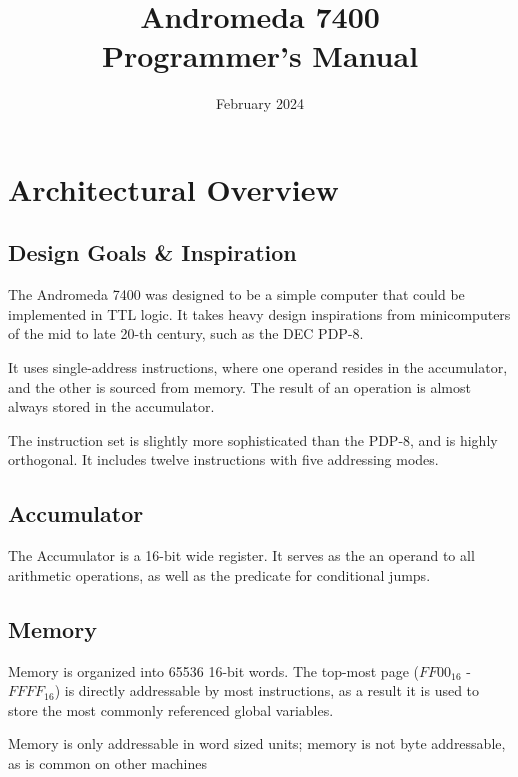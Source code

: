 \documentclass[11pt]{article}
\title{
    Andromeda 7400\\
\large Programmer's Manual}
\date{February 2024}
\begin{document}
    \maketitle

    \pagebreak
    \tableofcontents
    \pagebreak

    \section{Architectural Overview}\label{subsec:archetctural-overview}
    \subsection{Design Goals \& Inspiration}\label{subsec:design-goals-&-inspiration}
    \par The Andromeda 7400 was designed to be a simple computer that could be implemented in TTL logic.
    It takes heavy design inspirations from minicomputers of the mid to late 20-th century, such as the
    DEC PDP-8.
    \par It uses single-address instructions, where one operand resides in the accumulator, and the other is
    sourced from memory.
    The result of an operation is almost always stored in the accumulator.
    \par The instruction set is slightly more sophisticated than the PDP-8, and is highly orthogonal.
    It includes twelve instructions with five addressing modes.

    \subsection{Accumulator}\label{subsec:accumulator}
    \par The Accumulator is a 16-bit wide register.
    It serves as the an operand to all arithmetic operations, as well as the predicate for conditional jumps.

    \subsection{Memory}\label{subsec:memory}
    \par Memory is organized into 65536 16-bit words.
    The top-most page ($FF00_{16}$ - $FFFF_{16}$) is directly addressable by most instructions, as a result it
    is used to store the most commonly referenced global variables.
    \par Memory is only addressable in word sized units; memory is not byte addressable, as is common on other machines
\end{document}
